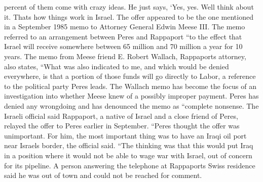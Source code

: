 \documentclass{article}
\begin{document}
percent of them come with crazy ideas. He just says, `Yes, yes. Well think about it. Thats how things work in \color[rgb]{0.7450980392156863,0.5411764705882353,0.4235294117647059}Israel. The \color[rgb]{0.6431372549019608,0.3764705882352941,0.9725490196078431}offer appeared to be the one mentioned in a September 1985 memo to Attorney General Edwin Meese III. The memo referred to an arrangement between Peres and Rappaport ``to the effect that \color[rgb]{0.7450980392156863,0.5411764705882353,0.4235294117647059}Israel will \color[rgb]{0.6431372549019608,0.3764705882352941,0.9725490196078431}receive somewhere between 65 million and 70 million a year for 10 years. The memo from Meese friend E. Robert Wallach, Rappaports attorney, also \color[rgb]{0.7450980392156863,0.5411764705882353,0.4235294117647059}states, \color[rgb]{0.6431372549019608,0.3764705882352941,0.9725490196078431}``What was also indicated to me, and which would be denied everywhere, is that a portion of those funds will go directly to Labor, a reference to the political party Peres leads. The Wallach memo has become the focus of an investigation into whether Meese knew of a possibly improper payment. Peres has denied any wrongdoing and has denounced the memo as ``complete nonsense. The \color[rgb]{0.7450980392156863,0.5411764705882353,0.4235294117647059}Israeli \color[rgb]{0.6431372549019608,0.3764705882352941,0.9725490196078431}official said Rappaport, a native of \color[rgb]{0.7450980392156863,0.5411764705882353,0.4235294117647059}Israel and a \color[rgb]{0.6431372549019608,0.3764705882352941,0.9725490196078431}close friend of Peres, relayed the offer to Peres earlier in September. ``Peres thought the offer was unimportant. For him, the most important thing was to have an Iraqi oil port near Israels border, the official said. ``The thinking was that this would put \color[rgb]{0.48627450980392156,0.5411764705882353,0.12549019607843137}Iraq in a \color[rgb]{0.6431372549019608,0.3764705882352941,0.9725490196078431}position where it would not be able to wage \color[rgb]{0.7450980392156863,0.5411764705882353,0.4235294117647059}war with Israel, out of \color[rgb]{0.6431372549019608,0.3764705882352941,0.9725490196078431}concern for its pipeline. A person answering the telephone at Rappaports Swiss residence said he was out of town and could not be reached for comment. 
\end{document}
